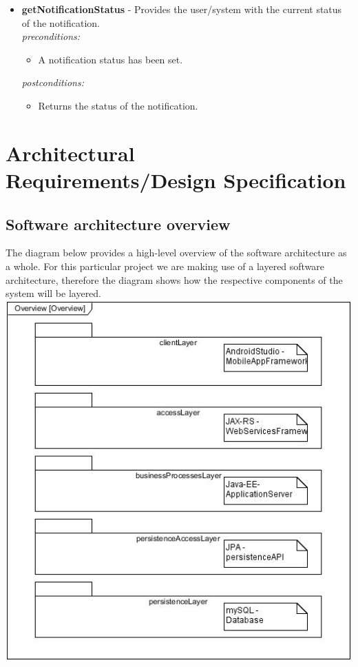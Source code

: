 \documentclass[a4paper,12pt]{article}
\begin{document}
\begin{itemize}
		\item \textbf{getNotificationStatus} -  Provides the user/system with the current status of the notification.\\[0.5cm]
		\textit{preconditions:}
		\begin{itemize}
			\item A notification status has been set.
		\end{itemize}
		
		\textit{postconditions:}
		\begin{itemize}
			\item Returns the status of the notification.\\[0.5cm]
		\end{itemize}
	\end{itemize}
	\newpage
	
	\section{Architectural Requirements/Design Specification}
	
	\subsection{Software architecture overview}
	
	The diagram below provides a high-level overview of the software architecture as a whole. For this particular project we are making use of a layered software architecture, therefore the diagram shows how the respective components of the system will be layered.\\
	
	\includegraphics[width=1\textwidth]{./Pictures/UML/architectureOverview.jpg}\\[1.5cm]
	
\end{document}
